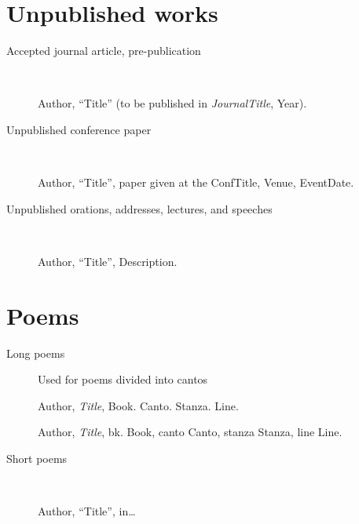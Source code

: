 \documentclass[extrafontsizes,11pt,a4paper,oneside]{memoir}
\newcommand*{\lit}[1]{\textsf{#1}}
\begin{document}

\section{Unpublished works}\label{sec:unpublished}

\begin{description}
  \item[Accepted journal article, pre-publication]~\par
  Author, \enquote{Title} (\lit{to be published in} \emph{JournalTitle}, Year).
  
  \item[Unpublished conference paper]~\par
  Author, \enquote{Title}, \lit{paper given at the} ConfTitle, Venue, EventDate.
  \\
  
  \item[Unpublished orations, addresses, lectures, and speeches]~\par Author, \enquote{Title}, Description.
\end{description}


\section{Poems}\label{sec:poem}

\begin{description}
  \item[Long poems] Used for poems divided into cantos
  \par Author, \emph{Title}, Book. Canto. Stanza. Line.
  \par Author, \emph{Title}, \lit{bk.} Book, \lit{canto} Canto, \lit{stanza} Stanza, \lit{line} Line.
  
  \item[Short poems]~\par
  \par Author, \enquote{Title}, in\dots
\end{description}
\end{document}
